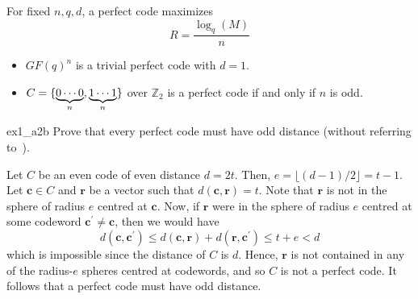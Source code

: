 For fixed $ n,q,d $, a perfect code maximizes
\[ R=\frac{\log_q(M)}{n} \]

\begin{Example}{}{}
    \begin{itemize}
        \item $ GF(q)^n $ is a trivial perfect code with $ d=1 $.
        \item $ C=\{\underbrace{0\cdots 0}_{n},\underbrace{1\cdots 1}_{n}\} $
              over $ \mathbb{Z}_2 $ is a perfect code if and only if $ n $ is odd.
    \end{itemize}
\end{Example}

\begin{Exercise}{}{ex1_a2b}
    Prove that every perfect code must have odd distance
    (without referring to~).
\end{Exercise}

\begin{Proof}{}{}
    Let $ C $ be an even code of even distance $ d=2t $. Then, $ e=\lfloor(d-1)/2\rfloor=t-1 $.
    Let $ \symbf{c}\in C $ and $ \symbf{r} $ be a vector such that $ d(\symbf{c},\symbf{r})=t $.
    Note that $ \symbf{r} $ is not in the sphere of radius $ e $ centred at $ \symbf{c} $.
    Now, if $ \symbf{r} $ were in the sphere of radius $ e $ centred at some codeword
    $ \symbf{c}^\prime\neq\symbf{c} $, then we would have
    \[ d(\symbf{c},\symbf{c}^\prime)\leqslant d(\symbf{c},\symbf{r})+d(\symbf{r},\symbf{c}^\prime)\leqslant t+e
        <d \]
    which is impossible since the distance of $ C $ is $ d $. Hence, $ \symbf{r} $ is not contained
    in any of the radius-$ e $ spheres centred at codewords, and so $ C $ is not
    a perfect code. It follows that a perfect code must have odd distance.
\end{Proof}

